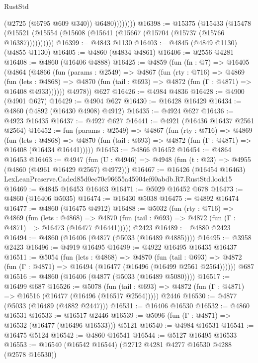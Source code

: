 \begin{lexlean}{RustStd}
\begin{coremodule}
                    (@2725 (@6795 @609 @340))
                    @6480))))))))
@16398 := @15375
    (@15433 (@15478 (@15521 (@15554 (@15608 (@15641 (@15667 (@15704 (@15737 (@15766 @16387))))))))))
@16399 := @4843 @1130
@16403 := @4845 (@4849 @1130) (@4855 @1130)
@16405 := @4860 (@4834 @4861)
@16406 := @2556 @4281
@16408 := @4860 (@16406 @4888)
@16425 := @4859
    (fun (fn : @7) =>
    @16405
      (@4864
        (@4866
          (fun (params : @2549) =>
          @4867
            (fun (rty : @716) =>
            @4869
              (fun (lets : @4868) =>
              @4870 (fun (tail : @693) => @4872 (fun (Γ : @4871) => @16408 @4933))))))
        @4978))
    @627
@16426 := @4984 @4836
@16428 := @4900 (@4901 @627)
@16429 := @4904 @627
@16430 := @16428 @16429
@16434 := @4860 (@4892 (@16430 @4908) @4912)
@16435 := @4924 @627
@16436 := @4923 @16435
@16437 := @4927 @627
@16441 := @4921 (@16436 @16437 @2561 @2564)
@16452 := fun (params : @2549) =>
  @4867
    (fun (rty : @716) =>
    @4869
      (fun (lets : @4868) =>
      @4870 (fun (tail : @693) => @4872 (fun (Γ : @4871) => @16408 (@16434 @16441)))))
@16453 := @4866 @16452
@16454 := @4864 @16453
@16463 := @4947
    (fun (U : @4946) => @4948 (fun (t : @23) => @4955 (@4860 (@4961 @16429 @2567) @4972)))
@16467 := @16426 (@16454 @16463) LexLeanPreserve.Caded85d0ec70c96655a45904ef60abdb.R7.RustStd.look15
@16469 := @4845 @16453 @16463
@16471 := @5029 @16452 @678
@16473 := @4860 (@16406 @5035)
@16474 := @16430 @5038
@16475 := @4892 @16474
@16477 := @4860 (@16475 @4912)
@16488 := @5032
    (fun (rty : @716) =>
    @4869
      (fun (lets : @4868) =>
      @4870 (fun (tail : @693) => @4872 (fun (Γ : @4871) => @16473 (@16477 @16441)))))
    @2423
@16489 := @4880 @2423
@16494 := @4860 (@16406 (@4877 (@5033 (@16489 @4885))))
@16495 := @3958 @2423
@16496 := @4919 @16495
@16499 := @4922 @16495 @16435 @16437
@16511 := @5054
    (fun (lets : @4868) =>
    @4870
      (fun (tail : @693) =>
      @4872 (fun (Γ : @4871) => @16494 (@16477 (@16496 (@16499 @2561 @2564))))))
    @687
@16516 := @4860 (@16406 (@4877 (@5033 (@16489 @5080))))
@16517 := @16499 @687
@16526 := @5078
    (fun (tail : @693) => @4872 (fun (Γ : @4871) => @16516 (@16477 (@16496 (@16517 @2564)))))
    @2446
@16530 := @4877 (@5033 (@16489 (@4882 @2447)))
@16531 := @16406 @16530
@16532 := @4860 @16531
@16533 := @16517 @2446
@16539 := @5096 (fun (Γ : @4871) => @16532 (@16477 (@16496 @16533))) @5121
@16540 := @4984 @16531
@16541 := @16475 @5124
@16542 := @4860 @16541
@16544 := @5127 @16495 @16533
@16553 := @16540 (@16542 @16544) (@2712 @4281 @4277 @16530 @4288 (@2578 @16530))

\end{coremodule}
\end{lexlean}
